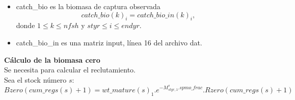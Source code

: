 \documentclass{article}
\begin{document}
\begin{itemize}
\begin{itemize}
        \item catch\_bio es la biomasa de captura observada
        \begin{equation}
          catch\_bio(k)_i=catch\_bio\_in(k)_i,  
        \end{equation}
        donde $1\leq k \leq nfsh$ y $styr\leq i \leq endyr$.
    \end{itemize}
    \begin{itemize}
        \item catch\_bio\_in es una matriz input, línea 16 del archivo dat. 
    \end{itemize}
\end{itemize}
\textbf{Cálculo de la biomasa cero}\\
Se necesita para calcular el reclutamiento.\\
Sea el stock número $s$:
\begin{equation}
    Bzero(cum\_regs(s)+1)=wt\_mature(s)_1.e^{-M^s_{styr,1}.spmo\_frac}.Rzero(cum\_regs(s)+1)
\end{equation}
\end{document}

